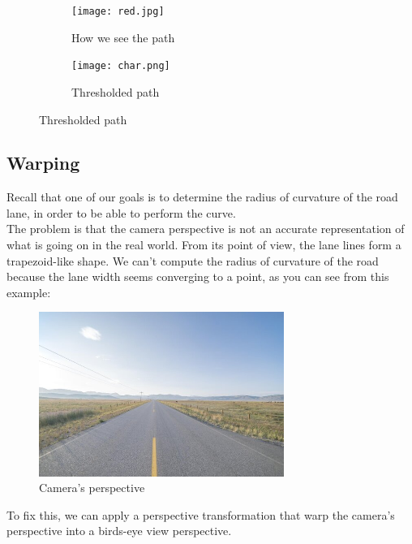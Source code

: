 \documentclass[12pt,a4paper]{article}
\begin{document}
\begin{large}
\begin{figure} [!htb]
  \centering
    \begin{subfigure}[b]{0.4\textwidth}
    \centering
    \captionsetup{justification=centering}
      \texttt{[image: red.jpg]}
      \caption{How we see the path}
      
    \end{subfigure}
    \hspace{1cm}
    \begin{subfigure}[b]{0.4\textwidth}
    \centering
    \captionsetup{justification=centering}
      \texttt{[image: char.png]}
      \caption{Thresholded path \\}
      
    \end{subfigure}
  \end{figure}

\subsection{Warping}
Recall that one of our goals is to determine the radius of curvature of the road lane, in order to be able to perform the curve. \\
The problem is that the camera perspective is not an accurate representation of what is going on in the real world. From its point of view, the lane lines form a trapezoid-like shape. We can't compute the radius of curvature of the road because the lane width seems converging to a point, as you can see from this example:\\

\begin{figure} [!htb]
\centering
\captionsetup{justification=centering}
\includegraphics[width=8cm]{images/road_endless_straight_vanishing.jpg}
\caption{Camera's perspective}
\end{figure}

To fix this, we can apply a perspective transformation that warp the camera's perspective into a birds-eye view perspective.


\end{large}
\end{document}
